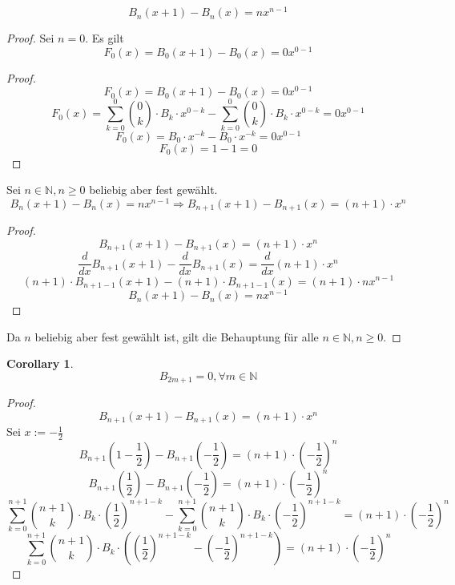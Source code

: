 \documentclass[12pt]{article}
\begin{document}
\[B_n(x+1) - B_n(x) = nx^{n-1}\]
\begin{proof}
Sei \(n = 0\).
Es gilt \[F_0(x) = B_0(x+1) - B_0(x) = 0x^{0-1}\]
\begin{proof}
\[F_0(x) = B_0(x+1) - B_0(x) = 0x^{0-1}\]
\[F_0(x) = \sum_{k=0}^0 {0 \choose k} \cdot B_k \cdot x^{0-k} - \sum_{k=0}^0 {0 \choose k} \cdot B_k \cdot x^{0-k} = 0x^{0-1}\]
\[F_0(x) = B_0 \cdot x^{-k} - B_0 \cdot x^{-k} = 0x^{0-1}\]
\[F_0(x) = 1 - 1 = 0\]
\end{proof}

Sei \(n \in \mathbb{N}, n \geq 0\) beliebig aber fest gewählt.
\[B_n(x+1) - B_n(x) = nx^{n-1} \Longrightarrow B_{n+1}(x+1) - B_{n+1}(x) = (n+1) \cdot x^n\]

\begin{proof}
\[B_{n+1}(x+1) - B_{n+1}(x) = (n+1) \cdot x^n\]
\[\frac{d}{dx} B_{n+1}(x+1) - \frac{d}{dx} B_{n+1}(x) = \frac{d}{dx} (n+1) \cdot x^n\]
\[(n+1) \cdot B_{n+1-1}(x+1) - (n+1) \cdot B_{n+1-1}(x) = (n+1) \cdot nx^{n-1}\]
\[B_{n}(x+1) - B_{n}(x) = nx^{n-1}\]
\end{proof}

Da \(n\) beliebig aber fest gewählt ist, gilt die Behauptung für alle \(n \in \mathbb{N}, n \geq 0\).
\end{proof}

\newtheorem{corollary}{Corollary}[theorem]
\begin{corollary}
\[B_{2m+1}=0, \forall m \in \mathbb{N}\]
\end{corollary}
\begin{proof}
\[B_{n+1}(x+1) - B_{n+1}(x) = (n+1) \cdot x^n\]
Sei \(x := -\frac{1}{2}\)
\[B_{n+1}\left(1-\frac{1}{2}\right) - B_{n+1}\left(-\frac{1}{2}\right) = (n+1)\cdot\left(-\frac{1}{2}\right)^n\]
\[B_{n+1}\left(\frac{1}{2}\right) - B_{n+1}\left(-\frac{1}{2}\right) = (n+1)\cdot\left(-\frac{1}{2}\right)^n\]
\[\sum_{k=0}^{n+1} {n+1 \choose k} \cdot B_k \cdot \left(\frac{1}{2}\right)^{n+1-k} - \sum_{k=0}^{n+1} {n+1 \choose k} \cdot B_k \cdot \left(-\frac{1}{2}\right)^{n+1-k} = (n+1)\cdot\left(-\frac{1}{2}\right)^n\]
\[\sum_{k=0}^{n+1} {n+1 \choose k} \cdot B_k \cdot \left(\left(\frac{1}{2}\right)^{n+1-k} - \left(-\frac{1}{2}\right)^{n+1-k}\right) = (n+1)\cdot\left(-\frac{1}{2}\right)^n\]
\end{proof}
\end{document}
